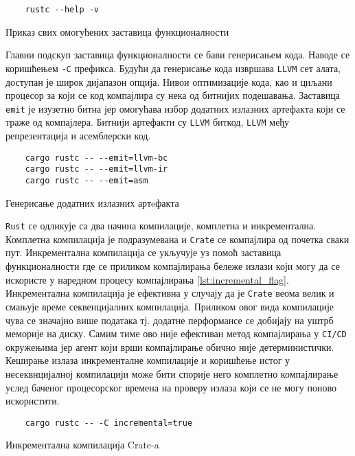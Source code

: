 \begin{listing}[H]
\begin{verbatim}
    rustc --help -v 
\end{verbatim}
\caption{Приказ свих омогућених заставица функционалности}
\label{lst:rustc_flags}
\end{listing}

Главни подскуп заставица функционалности се бави генерисањем кода. Наводе се коришћењем \verb|-C| префикса. 
Будући да генерисање кода извршава 
\verb|LLVM| сет алата, доступан је широк дијапазон опција. Нивои оптимизације кода, као и циљани процесор за који 
се код компајлира су нека од битнијих подешавања. Заставица \verb|emit| је изузетно битна јер омогућава избор 
додатних излазних артефакта који се траже од компајлера. Битнији артефакти су \verb|LLVM| биткод, \verb|LLVM| међу 
репрезентација и асемблерски код.

\begin{listing}[H]
\begin{verbatim}
    cargo rustc -- --emit=llvm-bc
    cargo rustc -- --emit=llvm-ir
    cargo rustc -- --emit=asm
\end{verbatim}
\caption{Генерисање додатних излазних артeфакта}
\label{lst:emit_flag}
\end{listing}


\verb|Rust| се одликује са два начина компилације, комплетна 
и инкрементална. Комплетна компилација је подразумевана и \verb|Crate| се компајлира од почетка сваки пут.
Инкрементална компилација се укључује уз помоћ заставица функционалности где се приликом компајлирања 
бележе излази који могу да се искористе у наредном процесу компајлирања \ref{lst:incremental_flag}. Инкрементална компилација је 
ефективна у случају да је \verb|Crate| веома велик и смањује време секвенцијалних компилација. Приликом овог 
вида компилације чува се значајно више података тј. додатне перформансе се добијају на уштрб меморије на диску.
Самим тиме ово није ефективан метод компајлирања у \verb|CI/CD| окружењима јер агент који врши компајлирање
обично није детерминистички. Кеширање излаза инкременталне компилације и коришћење истог у несеквнцијалној 
компилацији може бити спорије него комплетно компајлирање услед баченог процесорског времена на проверу 
излаза који се не могу поново искористити.

\begin{listing}[H]
\begin{verbatim}
    cargo rustc -- -C incremental=true 
\end{verbatim}
\caption{Инкрементална компилација Crate-a}
\label{lst:incremental_flag}
\end{listing}


